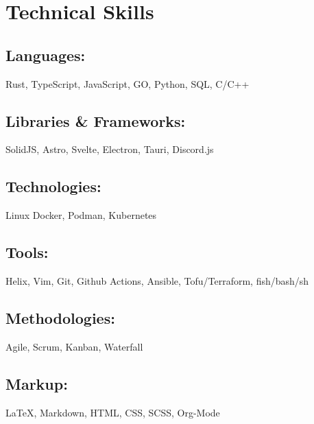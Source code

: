 \section{Technical Skills}

\subsection{Languages:} Rust, TypeScript, JavaScript, GO, Python, SQL, C/C++
\subsection{Libraries \& Frameworks:} SolidJS, Astro, Svelte, Electron, Tauri, Discord.js
\subsection{Technologies:} Linux Docker, Podman, Kubernetes
\subsection{Tools:} Helix, Vim, Git, Github Actions, Ansible, Tofu/Terraform, fish/bash/sh
\subsection{Methodologies:} Agile, Scrum, Kanban, Waterfall
\subsection{Markup:} {\LaTeX}, Markdown, HTML, CSS, SCSS, Org-Mode
